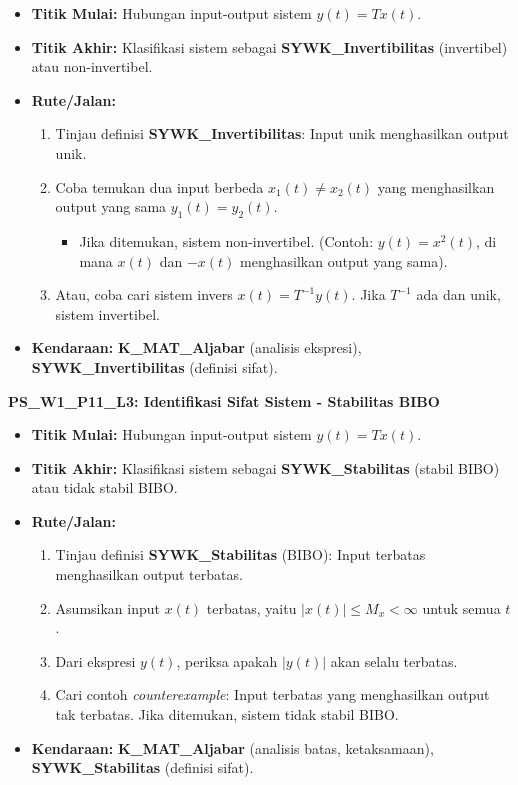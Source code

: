 \documentclass[
  letterpaper,
  DIV=11,
  numbers=noendperiod]{scrreprt}
\providecommand{\tightlist}{%
  \setlength{\itemsep}{0pt}\setlength{\parskip}{0pt}}
\begin{document}
\begin{itemize}
\tightlist
\item
  \textbf{Titik Mulai:} Hubungan input-output sistem \(y(t) = T{x(t)}\).
\item
  \textbf{Titik Akhir:} Klasifikasi sistem sebagai
  \textbf{SYWK\_Invertibilitas} (invertibel) atau non-invertibel.
\item
  \textbf{Rute/Jalan:}

  \begin{enumerate}
  \def\labelenumi{\arabic{enumi}.}
  \tightlist
  \item
    Tinjau definisi \textbf{SYWK\_Invertibilitas}: Input unik
    menghasilkan output unik.
  \item
    Coba temukan dua input berbeda \(x_1(t) \neq x_2(t)\) yang
    menghasilkan output yang sama \(y_1(t) = y_2(t)\).

    \begin{itemize}
    \tightlist
    \item
      Jika ditemukan, sistem non-invertibel. (Contoh: \(y(t) = x^2(t)\),
      di mana \(x(t)\) dan \(-x(t)\) menghasilkan output yang sama).
    \end{itemize}
  \item
    Atau, coba cari sistem invers \(x(t) = T^{-1}{y(t)}\). Jika
    \(T^{-1}\) ada dan unik, sistem invertibel.
  \end{enumerate}
\item
  \textbf{Kendaraan:} \textbf{K\_MAT\_Aljabar} (analisis ekspresi),
  \textbf{SYWK\_Invertibilitas} (definisi sifat).
\end{itemize}

\textbf{PS\_W1\_P11\_L3: Identifikasi Sifat Sistem - Stabilitas BIBO}

\begin{itemize}
\tightlist
\item
  \textbf{Titik Mulai:} Hubungan input-output sistem \(y(t) = T{x(t)}\).
\item
  \textbf{Titik Akhir:} Klasifikasi sistem sebagai
  \textbf{SYWK\_Stabilitas} (stabil BIBO) atau tidak stabil BIBO.
\item
  \textbf{Rute/Jalan:}

  \begin{enumerate}
  \def\labelenumi{\arabic{enumi}.}
  \tightlist
  \item
    Tinjau definisi \textbf{SYWK\_Stabilitas} (BIBO): Input terbatas
    menghasilkan output terbatas.
  \item
    Asumsikan input \(x(t)\) terbatas, yaitu \(|x(t)| \le M_x < \infty\)
    untuk semua \(t\).
  \item
    Dari ekspresi \(y(t)\), periksa apakah \(|y(t)|\) akan selalu
    terbatas.
  \item
    Cari contoh \emph{counterexample}: Input terbatas yang menghasilkan
    output tak terbatas. Jika ditemukan, sistem tidak stabil BIBO.
  \end{enumerate}
\item
  \textbf{Kendaraan:} \textbf{K\_MAT\_Aljabar} (analisis batas,
  ketaksamaan), \textbf{SYWK\_Stabilitas} (definisi sifat).
\end{itemize}
\end{document}
